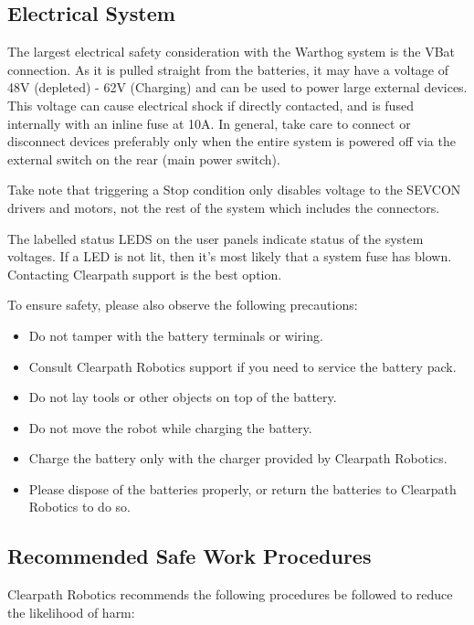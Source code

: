 \documentclass[]{clearpath-latex/clearpath-manual}
\begin{document}
\subsection{Electrical System}

The largest electrical safety consideration with the Warthog system is the VBat connection. As it is pulled straight from the batteries, it may have a voltage of 48V (depleted) - 62V (Charging) and can be used to power large external devices. This voltage can cause electrical shock if directly contacted, and is fused internally with an inline fuse at 10A. In general, take care to connect or disconnect devices preferably only when the entire system is powered off via the external switch on the rear (main power switch).

Take note that triggering a Stop condition only disables voltage to the SEVCON drivers and motors, not the rest of the system which includes the connectors.

The labelled status LEDS on the user panels indicate status of the system voltages. If a LED is not lit, then it's most likely that a system fuse has blown. Contacting Clearpath support is the best option.

To ensure safety, please also observe the following precautions:

\begin{itemize}[nolistsep]
  \item Do not tamper with the battery terminals or wiring.
  \item Consult Clearpath Robotics support if you need to service the battery pack.
  \item Do not lay tools or other objects on top of the battery.
  \item Do not move the robot while charging the battery.
  \item Charge the battery only with the charger provided by Clearpath Robotics.
  \item Please dispose of the batteries properly, or return the batteries to Clearpath Robotics to do so.
\end{itemize}

\subsection{Recommended Safe Work Procedures}

Clearpath Robotics recommends the following procedures be followed to reduce the likelihood of harm:
\end{document}
